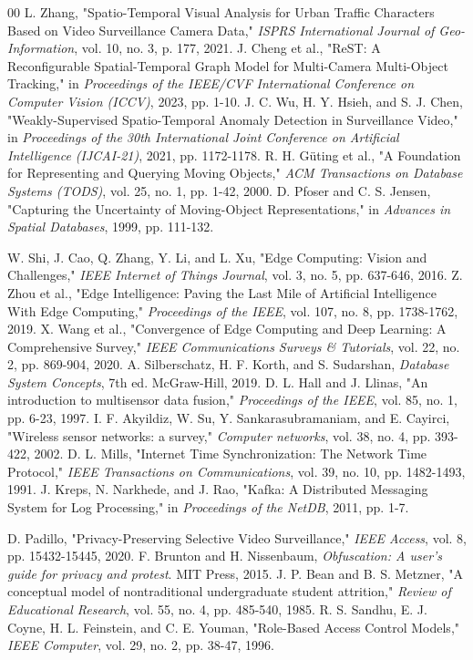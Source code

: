\documentclass[conference]{IEEEtran}
\begin{document}
\begin{thebibliography}{00}
 L. Zhang, "Spatio-Temporal Visual Analysis for Urban Traffic Characters Based on Video Surveillance Camera Data," \textit{ISPRS International Journal of Geo-Information}, vol. 10, no. 3, p. 177, 2021.
 J. Cheng et al., "ReST: A Reconfigurable Spatial-Temporal Graph Model for Multi-Camera Multi-Object Tracking," in \textit{Proceedings of the IEEE/CVF International Conference on Computer Vision (ICCV)}, 2023, pp. 1-10.
 J. C. Wu, H. Y. Hsieh, and S. J. Chen, "Weakly-Supervised Spatio-Temporal Anomaly Detection in Surveillance Video," in \textit{Proceedings of the 30th International Joint Conference on Artificial Intelligence (IJCAI-21)}, 2021, pp. 1172-1178.
 R. H. Güting et al., "A Foundation for Representing and Querying Moving Objects," \textit{ACM Transactions on Database Systems (TODS)}, vol. 25, no. 1, pp. 1-42, 2000.
 D. Pfoser and C. S. Jensen, "Capturing the Uncertainty of Moving-Object Representations," in \textit{Advances in Spatial Databases}, 1999, pp. 111-132.

 W. Shi, J. Cao, Q. Zhang, Y. Li, and L. Xu, "Edge Computing: Vision and Challenges," \textit{IEEE Internet of Things Journal}, vol. 3, no. 5, pp. 637-646, 2016.
 Z. Zhou et al., "Edge Intelligence: Paving the Last Mile of Artificial Intelligence With Edge Computing," \textit{Proceedings of the IEEE}, vol. 107, no. 8, pp. 1738-1762, 2019.
 X. Wang et al., "Convergence of Edge Computing and Deep Learning: A Comprehensive Survey," \textit{IEEE Communications Surveys \& Tutorials}, vol. 22, no. 2, pp. 869-904, 2020.
 A. Silberschatz, H. F. Korth, and S. Sudarshan, \textit{Database System Concepts}, 7th ed. McGraw-Hill, 2019.
 D. L. Hall and J. Llinas, "An introduction to multisensor data fusion," \textit{Proceedings of the IEEE}, vol. 85, no. 1, pp. 6-23, 1997.
 I. F. Akyildiz, W. Su, Y. Sankarasubramaniam, and E. Cayirci, "Wireless sensor networks: a survey," \textit{Computer networks}, vol. 38, no. 4, pp. 393-422, 2002.
 D. L. Mills, "Internet Time Synchronization: The Network Time Protocol," \textit{IEEE Transactions on Communications}, vol. 39, no. 10, pp. 1482-1493, 1991.
 J. Kreps, N. Narkhede, and J. Rao, "Kafka: A Distributed Messaging System for Log Processing," in \textit{Proceedings of the NetDB}, 2011, pp. 1-7.

 D. Padillo, "Privacy-Preserving Selective Video Surveillance," \textit{IEEE Access}, vol. 8, pp. 15432-15445, 2020.
 F. Brunton and H. Nissenbaum, \textit{Obfuscation: A user's guide for privacy and protest}. MIT Press, 2015.
 J. P. Bean and B. S. Metzner, "A conceptual model of nontraditional undergraduate student attrition," \textit{Review of Educational Research}, vol. 55, no. 4, pp. 485-540, 1985.
 R. S. Sandhu, E. J. Coyne, H. L. Feinstein, and C. E. Youman, "Role-Based Access Control Models," \textit{IEEE Computer}, vol. 29, no. 2, pp. 38-47, 1996.


\end{thebibliography}
\end{document}
